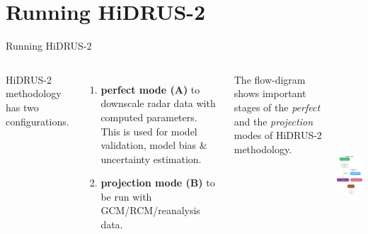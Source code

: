 \documentclass[aspectratio=169]{beamer}
\begin{document}
\section{Running HiDRUS-2}
%
\begin{frame}{Running HiDRUS-2}
\begin{columns}
HiDRUS-2 methodology has two configurations.
\begin{enumerate}
\item \textbf{perfect mode (A)} to downscale radar data with computed parameters. This is used for model validation, model bias \& uncertainty estimation.
\item \textbf{projection mode (B)} to be run with GCM/RCM/reanalysis data.
\end{enumerate}
The flow-digram shows important stages of the \emph{perfect} and the \emph{projection} modes of HiDRUS-2 methodology.

	\includegraphics[height=3in]{../fig/flow.pdf}
\end{columns}
\end{frame}
%
%
%
%
%
\end{document}
